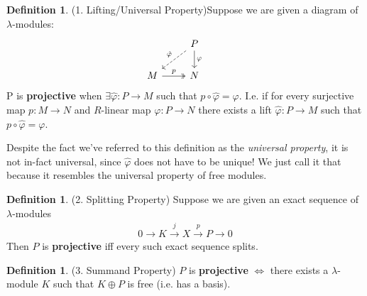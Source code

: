 \documentclass[12pt]{book}
\theoremstyle{definition}
\newtheorem{definition}[theorem]{Definition}
\begin{document}
\begin{definition}(1. Lifting/Universal Property)\label{ProjLift}
    Suppose we are given a diagram of $\lambda$-modules: 
    \[
    \begin{tikzcd}
    & P \arrow[ld, dashed, "\hat{\varphi}"'] \arrow[d, "\varphi"] & \\
    M \arrow[r, two heads, "p"] & N &
    \end{tikzcd}
    \]
    P is \textbf{projective} when $\exists \hat{\varphi} : P \rightarrow M$ such that $p \circ \hat{\varphi} = \varphi$. I.e. if for every surjective map $p : M \to N$ and $R$-linear map $\varphi : P \to N$ there exists a lift $\hat{\varphi} : P \to M$ such that $p \circ \hat{\varphi} = \varphi$. 
\end{definition}

Despite the fact we've referred to this definition as the \textit{universal property}, it is not in-fact universal, since $\hat{\varphi}$ does not have to be unique! We just call it that because it resembles the universal property of free modules. 

\begin{definition}(2. Splitting Property)
    Suppose we are given an exact sequence of $\lambda$-modules 
    \begin{align*}
        0 \rightarrow K \xrightarrow{j} X \xrightarrow{p} P \rightarrow 0
    \end{align*}
    Then $P$ is \textbf{projective} iff every such exact sequence splits. 
\end{definition}

\begin{definition}(3. Summand Property)
    $P$ is \textbf{projective} $\iff$ there exists a $\lambda$-module $K$ such that $K \oplus P$ is free (i.e. has a basis).
\end{definition}
\end{document}
